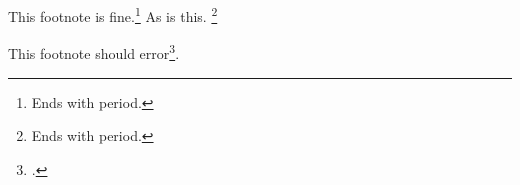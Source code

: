 \documentclass{article}
\begin{document}
This footnote is fine.\footnote{Ends with period.}
As is this.%
	\footnote{Ends with period.}

This footnote should error\footcite{SS}.
\end{document}
